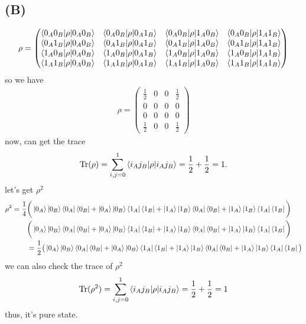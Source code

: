 \documentclass{article}
\newcommand{\sand}[3]{\braket{#1 | #2 | #3}}
\begin{document}
 \subsection*{(B)}
\begin{align*}
    \rho = \begin{pmatrix}\sand{0_A0_B}{\rho}{0_A0_B}&\sand{0_A0_B}{\rho}{0_A1_B}&\sand{0_A0_B}{\rho}{1_A0_B}&\sand{0_A0_B}{\rho}{1_A1_B}\\\sand{0_A1_B}{\rho}{0_A0_B}&\sand{0_A1_B}{\rho}{0_A1_B}&\sand{0_A1_B}{\rho}{1_A0_B}&\sand{0_A1_B}{\rho}{1_A1_B}\\\sand{1_A0_B}{\rho}{0_A0_B}&\sand{1_A0_B}{\rho}{0_A1_B}&\sand{1_A0_B}{\rho}{1_A0_B}&\sand{1_A0_B}{\rho}{1_A1_B}\\\sand{1_A1_B}{\rho}{0_A0_B}&\sand{1_A1_B}{\rho}{0_A1_B}&\sand{1_A1_B}{\rho}{1_A0_B}&\sand{1_A1_B}{\rho}{1_A1_B}\end{pmatrix}
\end{align*}
so we have
\begin{align*}
    \rho = \begin{pmatrix}\frac{1}{2}&0&0&\frac{1}{2}\\0&0&0&0\\0&0&0&0\\\frac{1}{2}&0&0&\frac{1}{2}\end{pmatrix}
\end{align*}
now, can get the trace
\begin{align*}
    \text{Tr}(\rho) = \sum_{i,j=0}^{1} \sand{i_Aj_B}{\rho}{i_Aj_B} = \frac{1}{2} + \frac{1}{2} = 1.
\end{align*}
let's get $\rho^2$
\begin{align*}
    \rho^2 = \frac{1}{4}&\bigg(\ket{0_A}\ket{0_B}\bra{0_A}\bra{0_B} + \ket{0_A}\ket{0_B}\bra{1_A}\bra{1_B} + \ket{1_A}\ket{1_B}\bra{0_A}\bra{0_B} + \ket{1_A}\ket{1_B}\bra{1_A}\bra{1_B}\bigg) \\
    &\bigg(\ket{0_A}\ket{0_B}\bra{0_A}\bra{0_B} + \ket{0_A}\ket{0_B}\bra{1_A}\bra{1_B} + \ket{1_A}\ket{1_B}\bra{0_A}\bra{0_B} + \ket{1_A}\ket{1_B}\bra{1_A}\bra{1_B}\bigg) \\
    &= \frac{1}{2}\big(\ket{0_A}\ket{0_B}\bra{0_A}\bra{0_B} + \ket{0_A}\ket{0_B}\bra{1_A}\bra{1_B} + \ket{1_A}\ket{1_B}\bra{0_A}\bra{0_B} + \ket{1_A}\ket{1_B}\bra{1_A}\bra{1_B}\big)
 \end{align*}
we can also check the trace of $\rho^2$
\begin{align*}
    \text{Tr}(\rho^2) = \sum_{i,j=0}^{1} \sand{i_Aj_B}{\rho}{i_Aj_B} = \frac{1}{2} + \frac{1}{2} = 1
\end{align*}
thus, it's pure state. 
\end{document}
